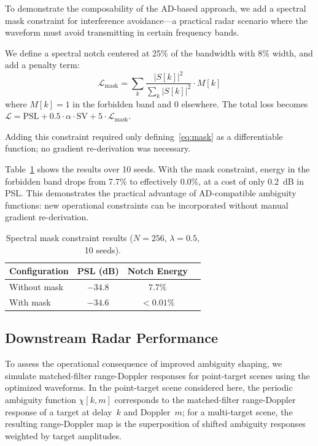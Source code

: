 \documentclass[journal]{IEEEtran}
\begin{document}
To demonstrate the composability of the AD-based approach, we add a spectral mask constraint for interference avoidance---a practical radar scenario where the waveform must avoid transmitting in certain frequency bands.

We define a spectral notch centered at 25\% of the bandwidth with 8\% width, and add a penalty term:
\begin{equation}
\mathcal{L}_{\text{mask}} = \sum_k \frac{|S[k]|^2}{\sum_k |S[k]|^2} \cdot M[k]
\label{eq:mask}
\end{equation}
where $M[k] = 1$ in the forbidden band and $0$ elsewhere.
The total loss becomes $\mathcal{L} = \text{PSL} + 0.5 \cdot \alpha \cdot \text{SV} + 5 \cdot \mathcal{L}_{\text{mask}}$.

Adding this constraint required only defining~\eqref{eq:mask} as a differentiable function; no gradient re-derivation was necessary.

Table~\ref{tab:mask} shows the results over 10 seeds.
With the mask constraint, energy in the forbidden band drops from 7.7\% to effectively 0.0\%, at a cost of only 0.2~dB in PSL.
This demonstrates the practical advantage of AD-compatible ambiguity functions: new operational constraints can be incorporated without manual gradient re-derivation.

\begin{table}[!htbp]
\centering
\caption{Spectral mask constraint results ($N=256$, $\lambda=0.5$, 10 seeds).}
\label{tab:mask}
\renewcommand{\arraystretch}{1.1}
\begin{tabular}{@{}lccc@{}}
\toprule
\textbf{Configuration} & \textbf{PSL (dB)} & \textbf{Notch Energy} \\
\midrule
Without mask & $-34.8$ & $7.7\%$ \\
With mask    & $-34.6$ & $< 0.01\%$ \\
\bottomrule
\end{tabular}
\end{table}

\subsection{Downstream Radar Performance}

To assess the operational consequence of improved ambiguity shaping, we simulate matched-filter range-Doppler responses for point-target scenes using the optimized waveforms.
In the point-target scene considered here, the periodic ambiguity function $\chi[k,m]$ corresponds to the matched-filter range-Doppler response of a target at delay~$k$ and Doppler~$m$; for a multi-target scene, the resulting range-Doppler map is the superposition of shifted ambiguity responses weighted by target amplitudes.
\end{document}
